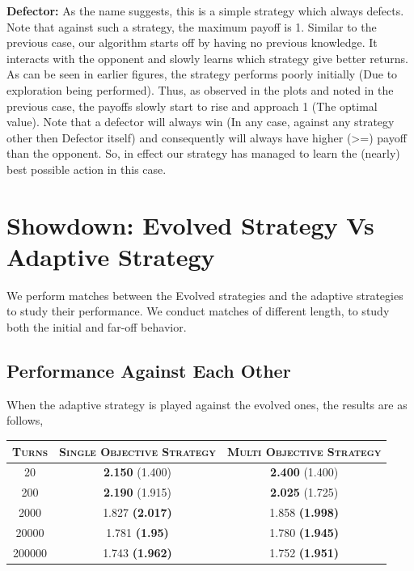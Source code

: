 \documentclass[a4paper]{article}
\begin{document}
	\noindent
	\textbf{Defector: } As the name suggests, this is a simple strategy which always defects. Note that against such a strategy, the maximum payoff is 1. 	Similar to the previous case, our algorithm starts off by having no previous knowledge. It interacts with the opponent and slowly learns which strategy give better returns. As can be seen in earlier figures, the strategy performs poorly initially (Due to exploration being performed). Thus, as observed in the plots and noted in the previous case, the payoffs slowly start to rise and approach 1 (The optimal value). Note that a defector will always win (In any case, against any strategy other then Defector itself) and consequently will always have higher (>=) payoff than the opponent. So, in effect our strategy has managed to learn the (nearly) best possible action in this case.

	\section{Showdown: Evolved Strategy Vs Adaptive Strategy}

	We perform matches between the Evolved strategies and the adaptive strategies to study their performance. We conduct matches of different length, to study both the initial and far-off behavior.
	
	\subsection{Performance Against Each Other}

	When the adaptive strategy is played against the evolved ones, the results are as follows,
	
	\begin{table}[H]
	  \begin{center}
	    \begin{tabular}{|c|c|c|}
	      \toprule
	 	  \textsc{Turns} & \textsc{Single Objective Strategy} & \textsc{Multi Objective Strategy}\\
	      \midrule
		  20    & \textbf{2.150} (1.400) & \textbf{2.400} (1.400)\\		  
		  200	& \textbf{2.190} (1.915) & \textbf{2.025} (1.725)\\
		  2000  & 1.827 \textbf{(2.017)} & 1.858 \textbf{(1.998)}\\
		  20000 & 1.781 \textbf{(1.95)} & 1.780 \textbf{(1.945)}\\
		  200000 & 1.743 \textbf{(1.962)} & 1.752 \textbf{(1.951)}\\
		\bottomrule
	    \end{tabular}
	  \end{center}
	\end{table}  		
	
\end{document}
